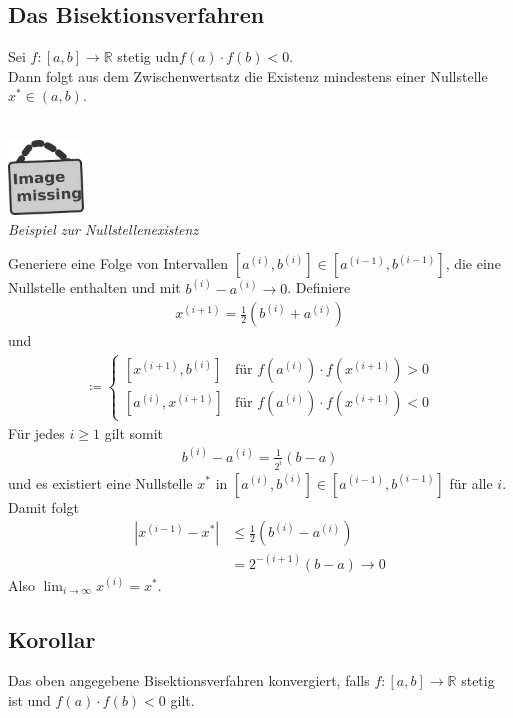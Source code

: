 \documentclass[ngerman,fontsize=11pt, paper=a4, parskip=half, titlepage=true, toc=bib]{scrbook}
\newcommand{\R}{\mathds{R}}
\newcommand{\imagemissing}[1]{
	\begin{center}~\\
		\centering 
		\includegraphics[width=2cm]{images/image_missing.jpg}\\
		\textit{#1} \\
	\end{center}
}
\begin{document}
	  \subsection{Das Bisektionsverfahren}
	  Sei $f:[a,b]\rightarrow \R $ stetig udn$f(a) \cdot f(b) <0$.\\
	  Dann folgt aus dem Zwischenwertsatz die Existenz
	  mindestens einer Nullstelle $x^{*}\in (a,b)$.
	  
	  \imagemissing{Beispiel zur Nullstellenexistenz}
	  
	  Generiere eine Folge von Intervallen
	  $[a^{(i)}, b^{(i)}]\in  [a^{(i-1)}, b^{(i-1)}] $,
	  die eine Nullstelle enthalten und mit $b^{(i)}-a^{(i)} \longrightarrow 0$.
	  Definiere
	  \begin{gather}
	  	x^{(i+1)}= \frac{1}{2}(b^{(i)}+a^{(i)})
	  	\label{V.1.1}
	  \end{gather}
	  und
	  \begin{gather}
	  	[a^{(i+1)}, b^{(i+1)}] \coloneqq \begin{cases}
	  		 [x^{(i+1)}, b^{(i)}] & \text{für } f(a^{(i)})\cdot f(x^{(i+1)}) > 0 \\
	  		 [a^{(i)}, x^{(i+1)}] & \text{für } f(a^{(i)})\cdot f(x^{(i+1)}) < 0
	  	\end{cases}
	  	\label{V.1.2}
	  \end{gather}
	  Für jedes $i\geq 1$ gilt somit
	  \begin{gather*}
	  	b^{(i)}-a^{(i)} = \frac{1}{2^i}(b-a)
	  \end{gather*}
	  und es existiert eine Nullstelle $x^{*}$ in $[a^{(i)}, b^{(i)}]\in  [a^{(i-1)}, b^{(i-1)}] $
	  für alle $i$. \\
	  Damit folgt
	  \begin{align*}
	  	|x^{(i-1)}-x^{*}| &\leq \frac{1}{2}(b^{(i)}-a^{(i)}) \\
	  								&=  2^{-(i+1)} (b-a) \longrightarrow 0
	  \end{align*}
	  Also $\lim_{i\rightarrow \infty}x^{(i)} = x^{*}$.
	  
	  
	\subsection{Korollar}
	Das oben angegebene Bisektionsverfahren konvergiert, falls
	$f:[a,b]\rightarrow \R $ stetig ist und 
	$f(a)\cdot f(b) <0$ gilt.
	
\end{document}
